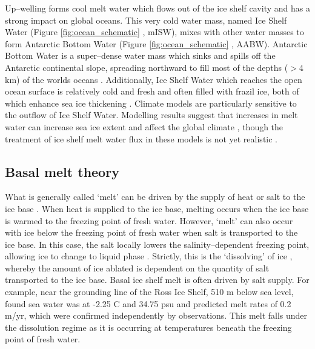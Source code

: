 Up--welling forms cool melt water which flows out of the ice shelf cavity and has a strong impact on global oceans. This very cold water mass, named Ice Shelf Water (Figure {\ref{fig:ocean_schematic}
}, mISW),  mixes with other water masses to form Antarctic Bottom Water (Figure {\ref{fig:ocean_schematic}
}, AABW). Antarctic Bottom Water is a super--dense water mass which sinks and spills off the Antarctic continental slope, spreading northward to fill most of the depths ($>$4 km) of the worlds oceans \citep{orsi1999circulation}. 
Additionally, Ice Shelf Water which reaches the open ocean surface is relatively cold and fresh and often filled with frazil ice, both of which enhance sea ice thickening \citep{langhorne2015observed}.
Climate models are particularly sensitive to the outflow of Ice Shelf Water. Modelling results suggest that increases in melt water can increase sea ice extent and affect the global climate \citep[e.g][]{merino2018impact,golledge2019global,bronselaer2018change}, though the treatment of ice shelf melt water flux in these models is not yet realistic \citep{jourdain2020protocol}.

\subsection{Basal melt theory} \label{basal_melt_theory}

What is generally called `melt' can be driven by the supply of heat or salt to the ice base \citep{wells2011melting}. When heat is supplied to the ice base, melting occurs when the ice base is warmed to the freezing point of fresh water. However, `melt' can also occur with ice below the freezing point of fresh water when salt is transported to the ice base. In this case, the salt locally lowers the salinity--dependent freezing point, allowing ice to change to liquid phase \citep[e.g.][]{mcphee1987dynamics}. Strictly, this is the `dissolving' of ice \citep[e.g][]{malyarenko2020synthesis}, whereby the amount of ice ablated is dependent on the quantity of salt transported to the ice base.
Basal ice shelf melt is often driven by salt supply. For example, near the grounding line of the Ross Ice Shelf, 510 m below sea level, \cite{robinson2020ice} found sea water was at -2.25 \textdegree C and 34.75 psu and predicted melt rates of 0.2 m/yr, which were confirmed independently by observations. This melt falls under the dissolution regime as it is occurring at temperatures beneath the freezing point of fresh water.

